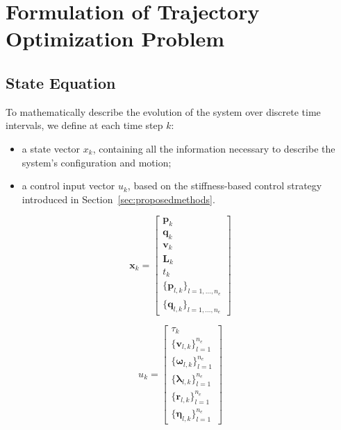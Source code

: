 \documentclass[main.tex]{subfiles}
\begin{document}
\section{Formulation of Trajectory Optimization Problem}
\label{sec:formulation}
\subsection{State Equation}
To mathematically describe the evolution of the system over discrete time intervals, we define at each time step $k$:
\begin{itemize}
    \item a state vector $x_k$, containing all the information necessary to describe the system's configuration and motion;
    \item a control input vector $u_k$, based on the stiffness-based control strategy introduced in Section~\ref{sec:proposedmethods}.
\end{itemize}

\vspace{0.3cm} %

\noindent
\begin{minipage}{0.48\textwidth}
\begin{equation}
    \mathbf{x}_k = 
    \left[
    \begin{array}{c}
    \mathbf{p}_k \\
    \mathbf{q}_k \\
    \mathbf{v}_k \\
    \mathbf{L}_k \\
    t_k \\
    \{\mathbf{p}_{l,k}\}_{l=1,\dots,n_e} \\
    \{\mathbf{q}_{l,k}\}_{l=1,\dots,n_e}
    \end{array}
    \right]
\end{equation}
\end{minipage}
\hfill
\begin{minipage}{0.48\textwidth}
\begin{equation}
    u_k = 
    \left[ 
   \begin{array}{c}
   \tau_k \\
   \{ \mathbf{v}_{l,k} \}_{l=1}^{n_e} \\
   \{ \boldsymbol{\omega}_{l,k} \}_{l=1}^{n_e} \\
   \{ \boldsymbol{\lambda}_{l,k} \}_{l=1}^{n_e} \\
   \{ \mathbf{r}_{l,k} \}_{l=1}^{n_e} \\
   \{ \boldsymbol{\eta}_{l,k} \}_{l=1}^{n_e} 
   \end{array}
   \right]
\end{equation}
\end{minipage}
\end{document}
